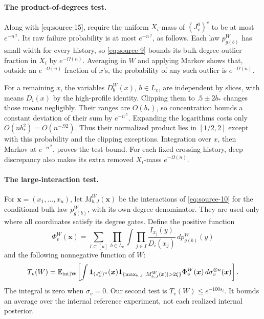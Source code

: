 \paragraph{The product-of-degrees test.}
Along with \eqref{eq:source-15}, require the uniform \(X_i\)-mass of \((J_v^0)^c\) to be at most \(e^{-n^{.2}}\). Its raw failure probability is at most \(e^{-n^{.2}}\), as follows. Each law \(p_{g(b)}^W\) has small width for every history, so \eqref{eq:source-9} bounds its bulk degree-outlier fraction in \(X_i\) by \(e^{-\Omega(n)}\). Averaging in \(W\) and applying Markov shows that, outside an \(e^{-\Omega(n)}\) fraction of \(x\)'s, the probability of any such outlier is \(e^{-\Omega(n)}\).

For a remaining \(x\), the variables \(D_b^W(x)\), \(b\in L_v\), are independent by slices, with means \(D_i(x)\) by the high-profile identity. Clipping them to \(.5\pm2b_*\) changes those means negligibly. Their ranges are \(O(b_*)\), so concentration bounds a constant deviation of their sum by \(e^{-n^{.5}}\). Expanding the logarithms costs only \(O(nb_*^2)=O(n^{-.92})\). Thus their normalized product lies in \([1/2,2]\) except with this probability and the clipping exceptions. Integration over \(x\), then Markov at \(e^{-n^{.2}}\), proves the test bound. For each fixed crossing history, deep discrepancy also makes its extra removed \(X_i\)-mass \(e^{-\Omega(n)}\).

\paragraph{The large-interaction test.}
For \(\boldsymbol x=(x_1,\ldots,x_u)\), let \(M^W_{b,J}(\boldsymbol x)\) be the interactions of \eqref{eq:source-10} for the conditional bulk law \(p_{g(b)}^W\), with its own degree denominator. They are used only where all coordinates satisfy its degree gates. Define the positive function
\[
 \Phi_v^W(\boldsymbol x)=
 \sum_{I\subseteq[u]}\prod_{b\in L_v}
      \int\prod_{j\in I}\frac{I_{x_j}(y)}{D_i(x_j)}\,dp_{g(b)}^W(y)
\]
and the following nonnegative function of \(W\):
\[
 T_v(W)=\mathbb E_{\rm int\mid W}\!\left[
  \int\mathbf1_{(J_v^0)^u}(\boldsymbol x)
  \mathbf1_{\{\max_{b,J}|M^W_{b,J}(\boldsymbol x)|>2\xi\}}
       \Phi_v^W(\boldsymbol x)\,d\sigma_v^{\otimes u}(\boldsymbol x)
  \right].
\]
The integral is zero when \(\sigma_v=0\). Our second test is \(T_v(W)\le e^{-100s_i}\). It bounds an average over the internal reference experiment, not each realized internal posterior.

